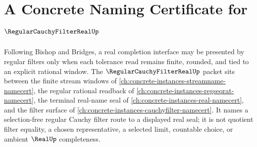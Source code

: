 \chapter{A Concrete Naming Certificate for $\RegularCauchyFilterRealUp$}
\label{ch:concrete-instances-regular-cauchy-filter-real-namecert}

Following Bishop and Bridges, a real completion interface may be presented by regular filters only when each tolerance read remains finite, rounded, and tied to an explicit rational window. The $\RegularCauchyFilterRealUp$ packet sits between the finite stream windows of \autoref{ch:concrete-instances-streamname-namecert}, the regular rational readback of \autoref{ch:concrete-instances-regseqrat-namecert}, the terminal real-name seal of \autoref{ch:concrete-instances-real-namecert}, and the filter surface of \autoref{ch:concrete-instances-cauchyfilter-namecert}. It names a selection-free regular Cauchy filter route to a displayed real seal; it is not quotient filter equality, a chosen representative, a selected limit, countable choice, or ambient $\RealUp$ completeness.

